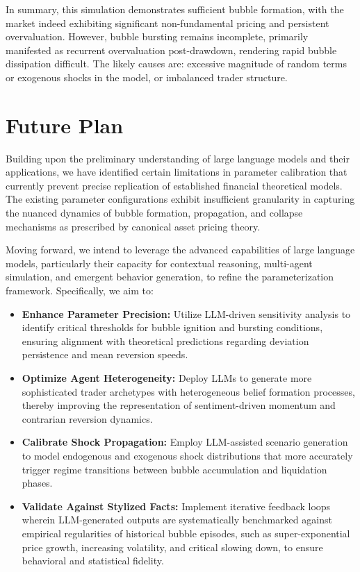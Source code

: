 \documentclass{article}
\begin{document}
In summary, this simulation demonstrates sufficient bubble formation, with the market indeed exhibiting significant non-fundamental pricing and persistent overvaluation. However, bubble bursting remains incomplete, primarily manifested as recurrent overvaluation post-drawdown, rendering rapid bubble dissipation difficult. The likely causes are: excessive magnitude of random terms or exogenous shocks in the model, or imbalanced trader structure.


\section{Future Plan}
\label{sec:future}

Building upon the preliminary understanding of large language models and their applications, we have identified certain limitations in parameter calibration that currently prevent precise replication of established financial theoretical models. The existing parameter configurations exhibit insufficient granularity in capturing the nuanced dynamics of bubble formation, propagation, and collapse mechanisms as prescribed by canonical asset pricing theory.

Moving forward, we intend to leverage the advanced capabilities of large language models, particularly their capacity for contextual reasoning, multi-agent simulation, and emergent behavior generation, to refine the parameterization framework. Specifically, we aim to:

\begin{itemize}[leftmargin=*]
  \item \textbf{Enhance Parameter Precision:} Utilize LLM-driven sensitivity analysis to identify critical thresholds for bubble ignition and bursting conditions, ensuring alignment with theoretical predictions regarding deviation persistence and mean reversion speeds.
  \item \textbf{Optimize Agent Heterogeneity:} Deploy LLMs to generate more sophisticated trader archetypes with heterogeneous belief formation processes, thereby improving the representation of sentiment-driven momentum and contrarian reversion dynamics.
  \item \textbf{Calibrate Shock Propagation:} Employ LLM-assisted scenario generation to model endogenous and exogenous shock distributions that more accurately trigger regime transitions between bubble accumulation and liquidation phases.
  \item \textbf{Validate Against Stylized Facts:} Implement iterative feedback loops wherein LLM-generated outputs are systematically benchmarked against empirical regularities of historical bubble episodes, such as super-exponential price growth, increasing volatility, and critical slowing down, to ensure behavioral and statistical fidelity.
\end{itemize}
\end{document}
